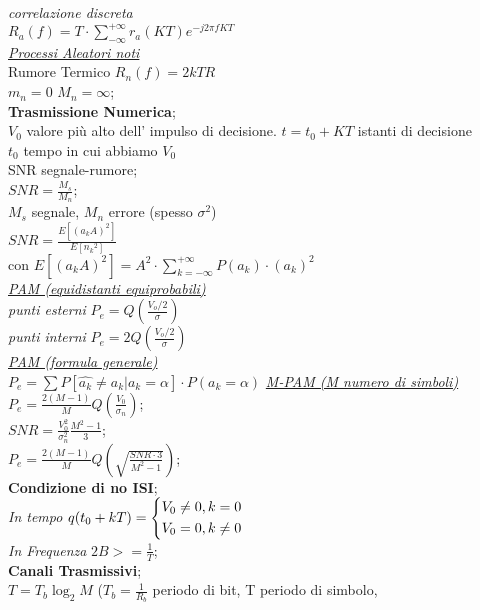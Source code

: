\documentclass[a4paper]{article}
\begin{document}
\begin{multicols*}{3}
\textit{correlazione discreta} \\
$R_a(f)=T\cdot\sum_{-\infty}^{+\infty}r_a(KT)e^{-j2\pi fKT}$ \\
\underline{\textit{Processi Aleatori noti}} \\
Rumore Termico $R_n(f)=2kTR$ \\
$m_n=0$ $M_n=\infty$; \\
\textbf{Trasmissione Numerica}; \\
$V_0$ valore più alto dell' impulso di decisione. 
$t=t_0 + KT$ istanti di decisione\\
$t_0$ tempo in cui abbiamo $V_0$ \\
SNR segnale-rumore; \\
$SNR=\frac{M_s}{M_n}$; \\ $M_s$ segnale, $M_n$ errore (spesso $\sigma^2$) \\ 
$SNR=\frac{E[{(a_k A)}^{2}]}{E[{n_k}^{2}]}$ \\
con $E[{(a_k A)}^{2}] = {A}^{2}\cdot \sum_{k=-\infty}^{+\infty}{P(a_k)\cdot {(a_k)}^{2}}$\\
\underline{\textit{PAM (equidistanti equiprobabili)}} \\
\textit{punti esterni}
$P_e = Q(\frac{V_o / 2}{\sigma}) $ \\
\textit{punti interni }
$P_e = 2Q(\frac{V_o / 2}{\sigma}) $ \\
\underline{\textit{PAM (formula generale)}} \\
$P_e=\sum{P[\widehat{a_k} \ne a_k | a_k=\alpha]\cdot P(a_k=\alpha)}$
\underline{\textit{M-PAM (M numero di simboli) }} \\
$P_e = \frac{2(M-1)}{M}Q(\frac{V_0}{\sigma_n})$;\\
$SNR = \frac{V_0^2}{\sigma_n^2}\frac{M^2-1}{3}$; \\
$P_e = \frac{2(M-1)}{M}Q(\sqrt{\frac{SNR \cdot 3}{M^2-1}})$; \\
\textbf{Condizione di no ISI}; \\
\textit{In tempo}
 $ q(t_{0}+kT)=
\begin{dcases}
    V_0\ne0 , k=0  \\
    V_0=0, k\ne0  \\
\end{dcases}
$ \\
\textit{In Frequenza}
$2B >= \frac{1}{T}$; \\
\textbf{Canali Trasmissivi}; \\
$T=T_b \log_{2}{M}$ ($T_b = \frac{1}{R_b}$ periodo di bit, T periodo di simbolo,

\end{multicols*}
\end{document}
